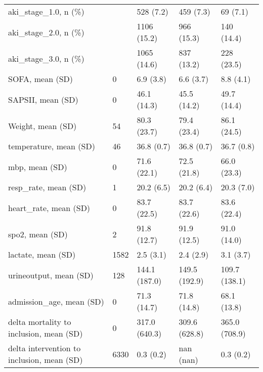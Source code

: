 \begin{tabular}{lllll}
aki\_stage\_1.0, n (\%)                              &         &      528 (7.2) &         459 (7.3) &               69 (7.1) \\
aki\_stage\_2.0, n (\%)                              &         &    1106 (15.2) &        966 (15.3) &             140 (14.4) \\
aki\_stage\_3.0, n (\%)                              &         &    1065 (14.6) &        837 (13.2) &             228 (23.5) \\
SOFA, mean (SD)                                   &       0 &      6.9 (3.8) &         6.6 (3.7) &              8.8 (4.1) \\
SAPSII, mean (SD)                                 &       0 &    46.1 (14.3) &       45.5 (14.2) &            49.7 (14.4) \\
Weight, mean (SD)                                 &      54 &    80.3 (23.7) &       79.4 (23.4) &            86.1 (24.5) \\
temperature, mean (SD)                            &      46 &     36.8 (0.7) &        36.8 (0.7) &             36.7 (0.8) \\
mbp, mean (SD)                                    &       0 &    71.6 (22.1) &       72.5 (21.8) &            66.0 (23.3) \\
resp\_rate, mean (SD)                              &       1 &     20.2 (6.5) &        20.2 (6.4) &             20.3 (7.0) \\
heart\_rate, mean (SD)                             &       0 &    83.7 (22.5) &       83.7 (22.6) &            83.6 (22.4) \\
spo2, mean (SD)                                   &       2 &    91.8 (12.7) &       91.9 (12.5) &            91.0 (14.0) \\
lactate, mean (SD)                                &    1582 &      2.5 (3.1) &         2.4 (2.9) &              3.1 (3.7) \\
urineoutput, mean (SD)                            &     128 &  144.1 (187.0) &     149.5 (192.9) &          109.7 (138.1) \\
admission\_age, mean (SD)                          &       0 &    71.3 (14.7) &       71.8 (14.8) &            68.1 (13.8) \\
delta mortality to inclusion, mean (SD)           &       0 &  317.0 (640.3) &     309.6 (628.8) &          365.0 (708.9) \\
delta intervention to inclusion, mean (SD)        &    6330 &      0.3 (0.2) &         nan (nan) &              0.3 (0.2) \\

\end{tabular}
